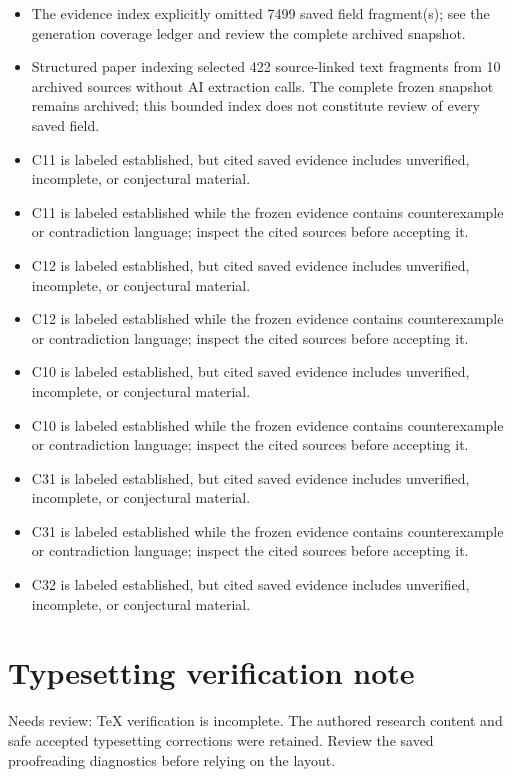 \documentclass[11pt]{article}
\begin{document}
\begin{itemize}
\item The evidence index explicitly omitted 7499 saved field fragment(s); see the generation coverage ledger and review the complete archived snapshot.
\item Structured paper indexing selected 422 source-linked text fragments from 10 archived sources without AI extraction calls. The complete frozen snapshot remains archived; this bounded index does not constitute review of every saved field.
\item C11 is labeled established, but cited saved evidence includes unverified, incomplete, or conjectural material.
\item C11 is labeled established while the frozen evidence contains counterexample or contradiction language; inspect the cited sources before accepting it.
\item C12 is labeled established, but cited saved evidence includes unverified, incomplete, or conjectural material.
\item C12 is labeled established while the frozen evidence contains counterexample or contradiction language; inspect the cited sources before accepting it.
\item C10 is labeled established, but cited saved evidence includes unverified, incomplete, or conjectural material.
\item C10 is labeled established while the frozen evidence contains counterexample or contradiction language; inspect the cited sources before accepting it.
\item C31 is labeled established, but cited saved evidence includes unverified, incomplete, or conjectural material.
\item C31 is labeled established while the frozen evidence contains counterexample or contradiction language; inspect the cited sources before accepting it.
\item C32 is labeled established, but cited saved evidence includes unverified, incomplete, or conjectural material.
\end{itemize}
\section*{Typesetting verification note}
Needs review: TeX verification is incomplete. The authored research content and safe accepted typesetting corrections were retained. Review the saved proofreading diagnostics before relying on the layout.
\end{document}
